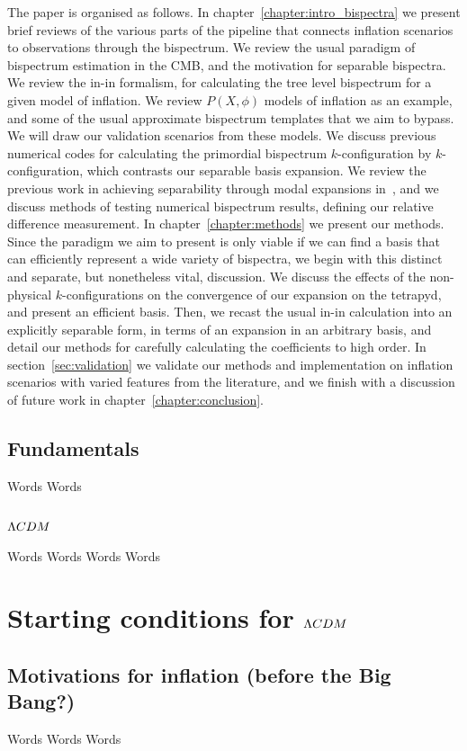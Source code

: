 The paper is organised as follows. In chapter~\ref{chapter:intro_bispectra} we present brief reviews
of the various parts of the pipeline that connects inflation scenarios to observations
through the bispectrum.
We review the usual paradigm of bispectrum estimation in the CMB,
and the motivation for separable bispectra. We review the in-in formalism,
for calculating the tree level bispectrum for a given model of inflation.
We review $P(X,\phi)$ models of inflation as an example, and
some of the usual approximate bispectrum templates
that we aim to bypass.
We will draw our validation scenarios from these models.
We discuss previous numerical codes for
calculating the primordial bispectrum $k$-configuration by $k$-configuration,
which contrasts our separable basis expansion.
We review the previous work in achieving separability through modal expansions
in~\cite{Funakoshi},
and we discuss methods of testing
numerical bispectrum results, defining our relative difference measurement.
In chapter~\ref{chapter:methods} we present our methods.
Since the paradigm we aim to present is only viable if we can find a basis
that can efficiently represent a wide variety of bispectra,
we begin with this distinct and separate, but nonetheless vital, discussion.
We discuss the effects of the
non-physical $k$-configurations on the convergence of our expansion on
the tetrapyd, and present an efficient basis.
Then, we recast the usual in-in calculation into an explicitly separable form,
in terms of an expansion in an arbitrary basis,
and detail our methods for carefully calculating the coefficients to high order.
In section~\ref{sec:validation} we validate our methods and implementation
on inflation scenarios with varied features from the literature,
and we finish with a discussion of future work in chapter~\ref{chapter:conclusion}.
    \subsection{Fundamentals}
    Words
\newpage
    Words
\newpage
    \subsection{$\Lambda CDM$}
    Words
\newpage
    Words
\newpage
    Words
\newpage
    Words
\newpage
\section{Starting conditions for $\Lambda CDM$}
    \subsection{Motivations for inflation (before the Big Bang?)}
    Words
\newpage
    Words
\newpage
    Words
\newpage

